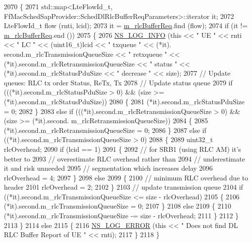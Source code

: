 \begin{DoxyCode}
2070 \{
2071   std::map<LteFlowId\_t, FfMacSchedSapProvider::SchedDlRlcBufferReqParameters>::iterator it;
2072   LteFlowId\_t flow (rnti, lcid);
2073   it = \hyperlink{classns3_1_1TtaFfMacScheduler_a55188f3ad1e0b4a62947e3e3ccb63ec5}{m\_rlcBufferReq}.find (flow);
2074   \textcolor{keywordflow}{if} (it != \hyperlink{classns3_1_1TtaFfMacScheduler_a55188f3ad1e0b4a62947e3e3ccb63ec5}{m\_rlcBufferReq}.end ())
2075     \{
2076       \hyperlink{group__logging_gafbd73ee2cf9f26b319f49086d8e860fb}{NS\_LOG\_INFO} (\textcolor{keyword}{this} << \textcolor{stringliteral}{" UE "} << rnti << \textcolor{stringliteral}{" LC "} << (uint16\_t)lcid << \textcolor{stringliteral}{" txqueue "} << (*it).
      second.m\_rlcTransmissionQueueSize << \textcolor{stringliteral}{" retxqueue "} << (*it).second.m\_rlcRetransmissionQueueSize << \textcolor{stringliteral}{" status "} 
      << (*it).second.m\_rlcStatusPduSize << \textcolor{stringliteral}{" decrease "} << size);
2077       \textcolor{comment}{// Update queues: RLC tx order Status, ReTx, Tx}
2078       \textcolor{comment}{// Update status queue}
2079       \textcolor{keywordflow}{if} (((*it).second.m\_rlcStatusPduSize > 0) && (size >= (*it).second.m\_rlcStatusPduSize))
2080         \{
2081            (*it).second.m\_rlcStatusPduSize = 0;
2082         \}
2083       \textcolor{keywordflow}{else} \textcolor{keywordflow}{if} (((*it).second.m\_rlcRetransmissionQueueSize > 0) && (size >= (*it).second.
      m\_rlcRetransmissionQueueSize))
2084         \{
2085           (*it).second.m\_rlcRetransmissionQueueSize = 0;
2086         \}
2087       \textcolor{keywordflow}{else} \textcolor{keywordflow}{if} ((*it).second.m\_rlcTransmissionQueueSize > 0)
2088         \{
2089           uint32\_t rlcOverhead;
2090           \textcolor{keywordflow}{if} (lcid == 1)
2091             \{
2092               \textcolor{comment}{// for SRB1 (using RLC AM) it's better to}
2093               \textcolor{comment}{// overestimate RLC overhead rather than}
2094               \textcolor{comment}{// underestimate it and risk unneeded}
2095               \textcolor{comment}{// segmentation which increases delay }
2096               rlcOverhead = 4;                                  
2097             \}
2098           \textcolor{keywordflow}{else}
2099             \{
2100               \textcolor{comment}{// minimum RLC overhead due to header}
2101               rlcOverhead = 2;
2102             \}
2103           \textcolor{comment}{// update transmission queue}
2104           \textcolor{keywordflow}{if} ((*it).second.m\_rlcTransmissionQueueSize <= size - rlcOverhead)
2105             \{
2106               (*it).second.m\_rlcTransmissionQueueSize = 0;
2107             \}
2108           \textcolor{keywordflow}{else}
2109             \{                    
2110               (*it).second.m\_rlcTransmissionQueueSize -= size - rlcOverhead;
2111             \}
2112         \}
2113     \}
2114   \textcolor{keywordflow}{else}
2115     \{
2116       \hyperlink{group__logging_ga0261a8db1d4ac5f79417d117634fd455}{NS\_LOG\_ERROR} (\textcolor{keyword}{this} << \textcolor{stringliteral}{" Does not find DL RLC Buffer Report of UE "} << rnti);
2117     \}
2118 \}
\end{DoxyCode}


